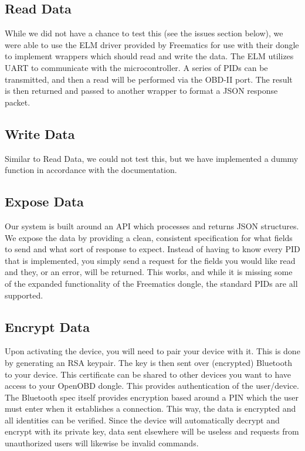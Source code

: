\documentclass[10pt,letterpaper,unboxed,cm]{article}
\begin{document}
\subsection{Read Data}

While we did not have a chance to test this (see the issues section below), we were able to use the ELM driver provided by Freematics for use with their dongle to implement wrappers which should read and write the data. The ELM utilizes UART to communicate with the microcontroller. A series of PIDs can be transmitted, and then a read will be performed via the OBD-II port. The result is then returned and passed to another wrapper to format a JSON response packet.

\subsection{Write Data}

Similar to Read Data, we could not test this, but we have implemented a dummy function in accordance with the documentation.

\subsection{Expose Data}

Our system is built around an API which processes and returns JSON structures. We expose the data by providing a clean, consistent specification for what fields to send and what sort of response to expect. Instead of having to know every PID that is implemented, you simply send a request for the fields you would like read and they, or an error, will be returned. This works, and while it is missing some of the expanded functionality of the Freematics dongle, the standard PIDs are all supported.

\subsection{Encrypt Data}

Upon activating the device, you will need to pair your device with it. This is done by generating an RSA keypair. The  key is then sent over (encrypted) Bluetooth to your device. This certificate can be shared to other devices you want to have access to your OpenOBD dongle. This provides authentication of the user/device. The Bluetooth spec itself provides encryption based around a PIN which the user must enter when it establishes a connection. This way, the data is encrypted and all identities can be verified. Since the device will automatically decrypt and encrypt with its private key, data sent elsewhere will be useless and requests from unauthorized users will likewise be invalid commands.
\end{document}
